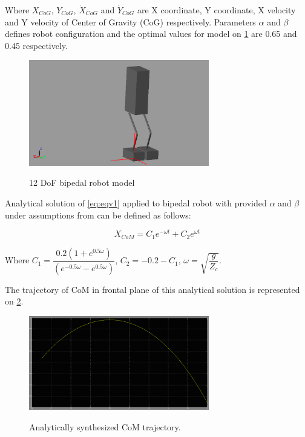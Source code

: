 \documentclass[12pt,a4paper]{report}
\begin{document}
		Where $X_{CoG}$, $Y_{CoG}$, $\dot{X}_{CoG}$ and $\dot{Y}_{CoG}$ are X coordinate, Y coordinate, X velocity and Y velocity of Center of Gravity (CoG) respectively. Parameters $\alpha$ and $\beta$ defines robot configuration and the optimal values for model on \cref{fig:21} are 0.65 and 0.45 respectively.
		
		\begin{figure}[h!]
			\vspace{-0.2cm}
			\centering
			{\includegraphics[width=0.7\textwidth]{21}}
			\caption{12 DoF bipedal robot model}
			\label{fig:21}
			\vspace{-0.1cm}
		\end{figure} 
		
		Analytical solution of \ref{eq:eqv1} applied to bipedal robot with provided $\alpha$ and $\beta$ under assumptions from \cite{ha2007effective} can be defined as follows:
		
		\begin{equation}
			X_{CoM} = C_1 e^{-\omega t} + C_2 e^{\omega t}
		\end{equation}
		
		Where $C_1 = \dfrac{0.2(1+e^{0.5\omega })}{(e^{-0.5\omega }-e^{0.5\omega })}$, $C_2=-0.2-C_1$, $\omega = \sqrt{\dfrac{g}{Z_c}}$.
		
		The trajectory of CoM in frontal plane of this analytical solution is represented on \cref{fig:24}.
		
			\begin{figure}[h!]
				\vspace{-0.2cm}
				\centering
				{\includegraphics[width=0.7\textwidth]{24}}
				\caption{Analytically synthesized CoM trajectory.}
				\label{fig:24}
				\vspace{-0.1cm}
			\end{figure}
		
\end{document}
